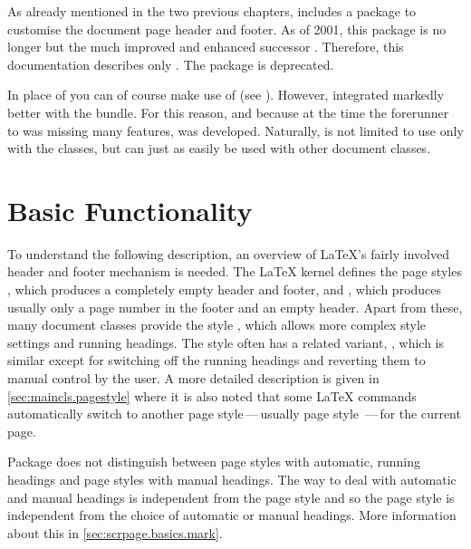 %
%
As already mentioned in the two previous chapters, {\KOMAScript} includes a
package to customise the document page header and footer.  As of 2001, this
package is no longer  but the much
improved and enhanced successor .  Therefore, this
documentation describes only .  The package
 is deprecated.

\begin{Explain}
  In place of  you can of course make use of
   (see \cite{package:fancyhdr}). However,
   integrated markedly better with the {\KOMAScript}
  bundle. For this reason, and because at the time the forerunner to
   was missing many features,  was
  developed. Naturally,  is not limited to use only
  with the {\KOMAScript} classes, but can just as easily be used with
  other document classes.
\end{Explain}


\section{Basic Functionality}\label{sec:scrpage.basics}

\begin{Explain}%
  To understand the following description, an overview of {\LaTeX}'s fairly
  involved header and footer mechanism is needed.  The {\LaTeX} kernel defines
  the page styles , which produces a completely empty header
  and footer, and , which produces usually only a page number
  in the footer and an empty header.  Apart from these, many document classes
  provide the style , which allows more complex style
  settings and running
  headings.  The
   style often has a related variant,
  , which is similar except for switching off the
  running headings and reverting them to manual control
  by the user.  A more detailed description is given in
  \autoref{sec:maincls.pagestyle} where it is also noted that some {\LaTeX}
  commands automatically switch to another page style\,---\,usually page style
  \,---\,for the current page.
\end{Explain}


Package  does not distinguish between page styles with
automatic, running headings and page styles with manual headings. The way to
deal with automatic and manual headings is independent from the page style and
so the page style is independent from the choice of automatic or manual
headings. More information about this in \autoref{sec:scrpage.basics.mark}.

